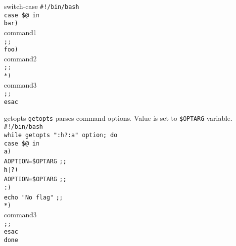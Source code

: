 \documentclass{beamer}
\let\tt\texttt
\begin{document}
\begin{frame}{switch-case}
        \tt{\#!/bin/bash}                       \\
        \tt{case \$@ in}                        \\
        \quad \tt{bar)}                         \\
        \quad \quad command1                    \\
        \quad \tt{;;}                           \\
        \quad \tt{foo)}                         \\
        \quad \quad command2                    \\
        \quad \tt{;;}                           \\
        \quad \tt{*)}                           \\
        \quad \quad command3                    \\
        \quad \tt{;;}                           \\
        \tt{esac}                               \\
\end{frame}

\begin{frame}{getopts}
        \tt{getopts} parses command options. Value is set to \tt{\$OPTARG} variable. \\
        \tt{\#!/bin/bash}   \\
        \tt{while getopts ":h?:a" option; do}       \\
        \quad \tt{case \$@ in}                      \\
        \quad \quad \tt{a)}                         \\
        \quad \quad \quad \tt{AOPTION=\$OPTARG} \tt{;;} \\
        \quad \quad \tt{h|?)}                           \\
        \quad \quad \quad \tt{AOPTION=\$OPTARG} \tt{;;} \\
        \quad \quad \tt{:)}                             \\
        \quad \quad \quad \tt{echo "No flag"} \tt{;;}   \\
        \quad \quad \tt{*)}                         \\
        \quad \quad \quad command3                  \\
        \quad \quad \tt{;;}                         \\
        \quad \tt{esac}                             \\
        \tt{done}                                   \\
\end{frame}
\end{document}
